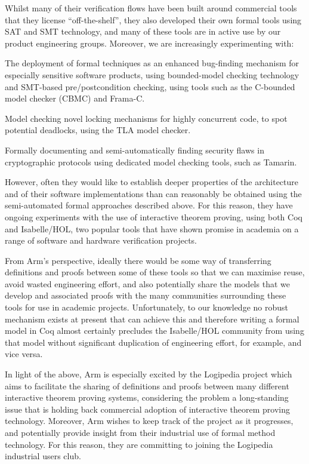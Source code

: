{Whilst many of their verification flows have been built around
commercial tools that they license ``off-the-shelf'', they also
developed their own formal tools using SAT and SMT technology, and
many of these tools are in active use by our product engineering
groups. Moreover, we are increasingly experimenting with:

\begin{compactitem}
\item The deployment of formal techniques as an enhanced bug-finding
  mechanism for especially sensitive software products, using
  bounded-model checking technology and SMT-based pre/postcondition
  checking, using tools such as the C-bounded model checker (CBMC) and
  Frama-C.
\item Model checking novel locking mechanisms for highly concurrent
  code, to spot potential deadlocks, using the TLA model checker.
\item Formally documenting and semi-automatically finding security
  flaws in cryptographic protocols using dedicated model checking
  tools, such as Tamarin.
\end{compactitem}

However, often they would like to establish deeper properties of the
architecture and of their software implementations than can reasonably
be obtained using the semi-automated formal approaches described
above. For this reason, they have ongoing experiments with the use of
interactive theorem proving, using both Coq and Isabelle/HOL, two
popular tools that have shown promise in academia on a range of
software and hardware verification projects.

From Arm’s perspective, ideally there would be some way of
transferring definitions and proofs between some of these tools so
that we can maximise reuse, avoid wasted engineering effort, and also
potentially share the models that we develop and associated proofs
with the many communities surrounding these tools for use in academic
projects. Unfortunately, to our knowledge no robust mechanism exists
at present that can achieve this and therefore writing a formal model
in Coq almost certainly precludes the Isabelle/HOL community from
using that model without significant duplication of engineering
effort, for example, and vice versa.

In light of the above, Arm is especially excited by the Logipedia
project which aims to facilitate the sharing of definitions and proofs
between many different interactive theorem proving systems,
considering the problem a long-standing issue that is holding back
commercial adoption of interactive theorem proving technology.
Moreover, Arm wishes to keep track of the project as it progresses,
and potentially provide insight from their industrial use of formal
method technology. For this reason, they are committing to joining
the Logipedia industrial users club.


}
